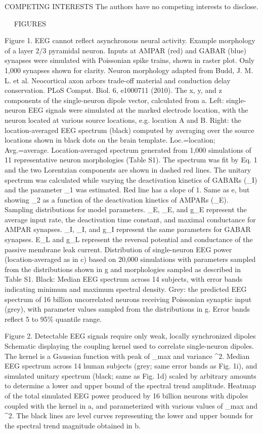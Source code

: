 COMPETING INTERESTS
The authors have no competing interests to disclose.

 
FIGURES

Figure 1. EEG cannot reflect asynchronous neural activity.
	Example morphology of a layer 2/3 pyramidal neuron. Inputs at AMPAR (red) and GABAR (blue) synapses were simulated with Poissonian spike trains, shown in raster plot. Only 1,000 synapses shown for clarity. Neuron morphology adapted from Budd, J. M. L. et al. Neocortical axon arbors trade-off material and conduction delay conservation. PLoS Comput. Biol. 6, e1000711 (2010).
	The x, y, and z components of the single-neuron dipole vector, calculated from a. 
	Left: single-neuron EEG signals were simulated at the marked electrode location, with the neuron located at various source locations, e.g. location A and B. Right: the location-averaged EEG spectrum (black) computed by averaging over the source locations shown in black dots on the brain template. Loc.=location; Avg.=average.
	Location-averaged spectrum generated from 1,000 simulations of 11 representative neuron morphologies (Table S1). The spectrum was fit by Eq. 1 and the two Lorentzian components are shown in dashed red lines.
	The unitary spectrum was calculated while varying the deactivation kinetics of GABARs (\tau_I) and the parameter \tau_1 was estimated. Red line has a slope of 1. 
	Same as e, but showing \tau_2 as a function of the deactivation kinetics of AMPARs (\tau_E).
	Sampling distributions for model parameters. \lambda_E, \tau_E, and g_E represent the average input rate, the deactivation time constant, and maximal conductance for AMPAR synapses. \lambda_I, \tau_I, and g_I represent the same parameters for GABAR synapses. E_L and g_L represent the reversal potential and conductance of the passive membrane leak current.
	Distribution of single-neuron EEG power (location-averaged as in c) based on 20,000 simulations with parameters sampled from the distributions shown in g and morphologies sampled as described in Table S1.
	Black: Median EEG spectrum across 14 subjects, with error bands indicating minimum and maximum spectral density. Grey: the predicted EEG spectrum of 16 billion uncorrelated neurons receiving Poissonian synaptic input (grey), with parameter values sampled from the distributions in g. Error bands reflect 5 to 95\% quantile range.

Figure 2. Detectable EEG signals require only weak, locally synchronized dipoles 
	Schematic displaying the coupling kernel used to correlate single-neuron dipoles. The kernel is a Gaussian function with peak of \rho_{max} and variance \sigma^2.
	Median EEG spectrum across 14 human subjects (grey; same error bands as Fig. 1i), and simulated unitary spectrum (black; same as Fig. 1d) scaled by arbitrary amounts to determine a lower and upper bound of the spectral trend amplitude. 
	Heatmap of the total simulated EEG power produced by 16 billion neurons with dipoles coupled with the kernel in a, and parameterized with various values of \rho_{max} and \sigma^2. The black lines are level curves representing the lower and upper bounds for the spectral trend magnitude obtained in b.

